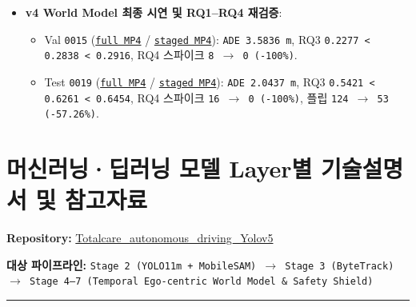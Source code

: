 \documentclass[10.5pt,a4paper]{article}
\begin{document}
\begin{itemize}[leftmargin=1.5em,itemsep=2pt]
\begin{itemize}[leftmargin=1.5em,itemsep=2pt]
\end{itemize}
\item \textbf{v4 World Model 최종 시연 및 RQ1--RQ4 재검증}:
\begin{itemize}[leftmargin=1.5em,itemsep=2pt]
\item Val \texttt{0015} (\href{https://github.com/Heisnotanimposter/Totalcare\_autonomous\_driving\_Yolov5/blob/main/results/v4\_road\_lane/world\_outputs/v4\_world\_outputs/world\_model\_0015\_full/world\_model\_demo\_0015.mp4}{\texttt{full MP4}} / \href{https://github.com/Heisnotanimposter/Totalcare\_autonomous\_driving\_Yolov5/blob/main/results/v4\_road\_lane/world\_outputs/v4\_world\_outputs/world\_model\_0015\_staged/world\_model\_demo\_0015.mp4}{\texttt{staged MP4}}): \texttt{ADE 3.\allowbreak{}5836 m}, RQ3 \texttt{0.\allowbreak{}2277 < 0.\allowbreak{}2838 < 0.\allowbreak{}2916}, RQ4 스파이크 \texttt{8 $\rightarrow$ 0 (-\allowbreak{}100\%)}.
\item Test \texttt{0019} (\href{https://github.com/Heisnotanimposter/Totalcare\_autonomous\_driving\_Yolov5/blob/main/results/v4\_road\_lane/world\_outputs/v4\_world\_outputs/world\_model\_0019\_full/world\_model\_demo\_0019.mp4}{\texttt{full MP4}} / \href{https://github.com/Heisnotanimposter/Totalcare\_autonomous\_driving\_Yolov5/blob/main/results/v4\_road\_lane/world\_outputs/v4\_world\_outputs/world\_model\_0019\_staged/world\_model\_demo\_0019.mp4}{\texttt{staged MP4}}): \texttt{ADE 2.\allowbreak{}0437 m}, RQ3 \texttt{0.\allowbreak{}5421 < 0.\allowbreak{}6261 < 0.\allowbreak{}6454}, RQ4 스파이크 \texttt{16 $\rightarrow$ 0 (-\allowbreak{}100\%)}, 플립 \texttt{124 $\rightarrow$ 53 (-\allowbreak{}57.\allowbreak{}26\%)}.
\end{itemize}
\end{itemize}
\newpage
\section{머신러닝·딥러닝 모델 Layer별 기술설명서 및 참고자료}

\textbf{Repository:} \href{https://github.com/Heisnotanimposter/Totalcare\_autonomous\_driving\_Yolov5}{Totalcare\_autonomous\_driving\_Yolov5}

\textbf{대상 파이프라인:} \texttt{Stage 2 (YOLO11m + MobileSAM) $\rightarrow$ Stage 3 (ByteTrack) $\rightarrow$ Stage 4--7 (Temporal Ego-\allowbreak{}centric World Model \& Safety Shield)}


\par\noindent\rule{\textwidth}{0.4pt}\par\medskip
\end{document}

